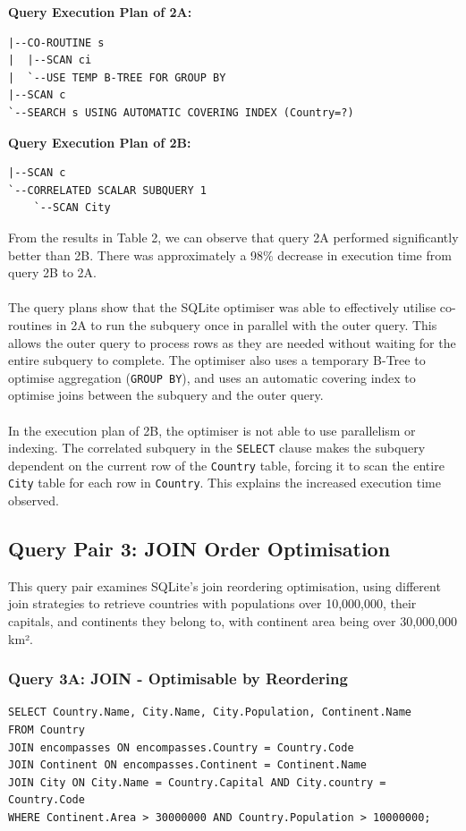 \documentclass[11pt]{article}
\begin{document}
\textbf{Query Execution Plan of 2A:}
\begin{verbatim}
|--CO-ROUTINE s
|  |--SCAN ci
|  `--USE TEMP B-TREE FOR GROUP BY
|--SCAN c
`--SEARCH s USING AUTOMATIC COVERING INDEX (Country=?)
\end{verbatim}


\textbf{Query Execution Plan of 2B:}
\begin{verbatim}
|--SCAN c
`--CORRELATED SCALAR SUBQUERY 1
    `--SCAN City
\end{verbatim}

\noindent From the results in Table 2, we can observe that query 2A performed significantly better than 2B. There was approximately a 98\%
decrease in execution time from query 2B to 2A.
\\ \\
The query plans show that the SQLite optimiser was able to effectively utilise co-routines in 2A to run the subquery once in parallel with the outer query.
This allows the outer query to process rows as they are needed without waiting for the entire subquery to complete. The optimiser also uses a temporary B-Tree
to optimise aggregation (\texttt{GROUP BY}), and uses an automatic covering index to optimise joins between the subquery and the outer query.
\\ \\
In the execution plan of 2B, the optimiser is not able to use parallelism or indexing. The correlated subquery in the \texttt{SELECT} clause makes
the subquery dependent on the current row of the \texttt{Country} table, forcing it to scan the entire \texttt{City} table for each row in \texttt{Country}. This explains the
increased execution time observed.


\subsection{Query Pair 3: JOIN Order Optimisation}

This query pair examines SQLite's join reordering optimisation, using different join strategies to retrieve countries with populations over 10,000,000,
their capitals, and continents they belong to, with continent area being over 30,000,000 km².

\subsubsection{Query 3A: JOIN - Optimisable by Reordering}

\begin{verbatim}
SELECT Country.Name, City.Name, City.Population, Continent.Name
FROM Country
JOIN encompasses ON encompasses.Country = Country.Code
JOIN Continent ON encompasses.Continent = Continent.Name
JOIN City ON City.Name = Country.Capital AND City.country = Country.Code
WHERE Continent.Area > 30000000 AND Country.Population > 10000000;
\end{verbatim}
\end{document}
